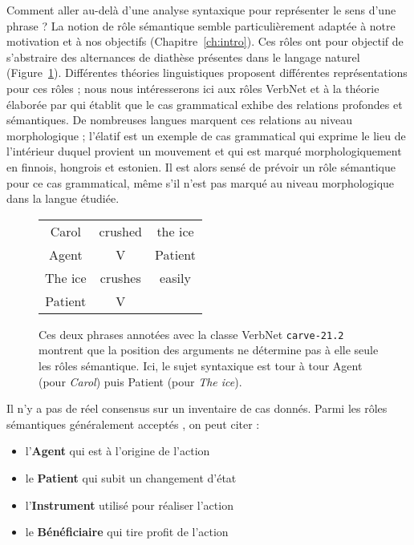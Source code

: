 Comment aller au-delà d'une analyse syntaxique pour représenter le sens d'une
phrase ? La notion de rôle sémantique semble particulièrement adaptée à notre
motivation et à nos objectifs (Chapitre~\ref{ch:intro}). Ces rôles ont pour
objectif de s'abstraire des alternances de diathèse présentes dans le langage
naturel (Figure~\ref{fig:exemple_srl}). Différentes théories linguistiques
proposent différentes représentations pour ces rôles ; nous nous intéresserons
ici aux rôles VerbNet et à la théorie élaborée par \cite{fillmore1968case} qui
établit que le cas grammatical exhibe des relations profondes et sémantiques.
De nombreuses langues marquent ces relations au niveau morphologique ; l'élatif
est un exemple de cas grammatical qui exprime le lieu de l'intérieur duquel
provient un mouvement et qui est marqué morphologiquement en finnois, hongrois
et estonien. Il est alors sensé de prévoir un rôle sémantique pour ce cas
grammatical, même s'il n'est pas marqué au niveau morphologique dans la langue
étudiée.


\begin{figure}[ht]
    \centering
    \begin{tabular}{ccc}
        \toprule
        Carol & crushed   & the ice \\
        Agent & V         & Patient \\
        \midrule
        The ice & crushes & easily  \\
        Patient & V       &         \\
        \bottomrule
    \end{tabular}

    \caption{\label{fig:exemple_srl}Ces deux phrases annotées avec la classe
    VerbNet \texttt{carve-21.2} montrent que la position des arguments ne
détermine pas à elle seule les rôles sémantique. Ici, le sujet syntaxique est
tour à tour Agent (pour \textit{Carol}) puis Patient (pour \textit{The ice}).}

\end{figure}

Il n'y a pas de réel consensus sur un inventaire de cas donnés. Parmi les rôles
sémantiques généralement acceptés \citep[p.~4]{palmer2010semantic}, on peut
citer :

\begin{itemize}
    \item l'\textbf{Agent} qui est à l'origine de l'action
    \item le \textbf{Patient} qui subit un changement d'état
    \item l'\textbf{Instrument} utilisé pour réaliser l'action
    \item le \textbf{Bénéficiaire} qui tire profit de l'action
\end{itemize}

